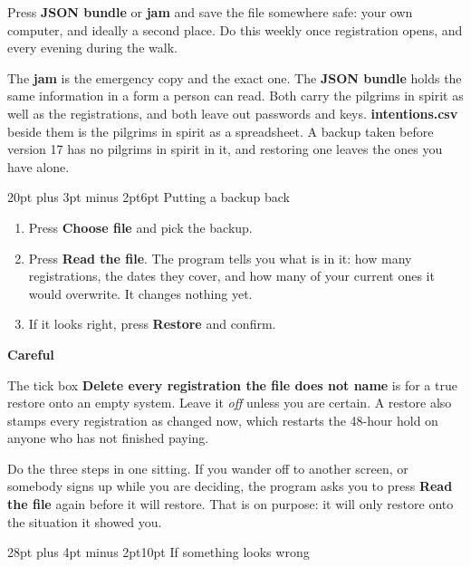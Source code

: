 \documentclass[12pt]{article}
\makeatletter
\renewcommand\section{\@startsection{section}{1}{0pt}%
  {28pt plus 4pt minus 2pt}{10pt}%
  {\normalfont\Large\bfseries\color{accent}}}
\renewcommand\subsection{\@startsection{subsection}{2}{0pt}%
  {20pt plus 3pt minus 2pt}{6pt}%
  {\normalfont\large\bfseries\color{ink}}}
\newcommand{\notecolour}{softbg}
\newenvironment{note}[2][softbg]
  {\renewcommand{\notecolour}{#1}%
   \par\medskip
   \setlength{\fboxsep}{11pt}%
   \begin{lrbox}{\notebox}%
   \begin{minipage}{\dimexpr\linewidth-2\fboxsep\relax}%
   \setlength{\parskip}{7pt}%
   \textbf{#2}\par}
  {\end{minipage}%
   \end{lrbox}%
   \noindent\expandafter\colorbox\expandafter{\notecolour}{\usebox{\notebox}}%
   \par\medskip}
\newcommand{\btn}[1]{\textbf{#1}}
\makeatother
\begin{document}
Press \btn{JSON bundle} or \btn{jam} and save the file somewhere safe:
your own computer, and ideally a second place. Do this weekly once
registration opens, and every evening during the walk.

The \textbf{jam} is the emergency copy and the exact one. The
\textbf{JSON bundle} holds the same information in a form a person can
read. Both carry the pilgrims in spirit as well as the registrations,
and both leave out passwords and keys. \btn{intentions.csv} beside them
is the pilgrims in spirit as a spreadsheet. A backup taken before
version 17 has no pilgrims in spirit in it, and restoring one leaves the
ones you have alone.

\subsection{Putting a backup back}

\begin{enumerate}[leftmargin=*,itemsep=6pt]
\item Press \btn{Choose file} and pick the backup.
\item Press \btn{Read the file}. The program tells you what is in it:
  how many registrations, the dates they cover, and how many of your
  current ones it would overwrite. It changes nothing yet.
\item If it looks right, press \btn{Restore} and confirm.
\end{enumerate}

\begin{note}[warnbg]{Careful}
The tick box \btn{Delete every registration the file does not name} is
for a true restore onto an empty system. Leave it \emph{off} unless you
are certain. A restore also stamps every registration as changed now,
which restarts the 48-hour hold on anyone who has not finished paying.
\end{note}

Do the three steps in one sitting. If you wander off to another screen,
or somebody signs up while you are deciding, the program asks you to
press \btn{Read the file} again before it will restore. That is on
purpose: it will only restore onto the situation it showed you.

\section{If something looks wrong}
\end{document}
